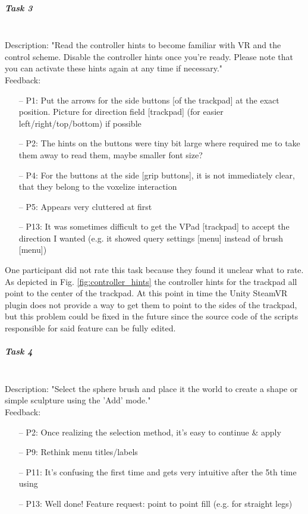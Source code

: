 \subparagraph{Task 3} \hfill \\
Description: "Read the controller hints to become familiar with VR and the control scheme. Disable the controller hints once you're ready. Please note that you can activate these hints
again at any time if necessary."\\
Feedback:
\begin{itemize} \setlength\itemsep{-0.5em}
	\item[--] P1: Put the arrows for the side buttons [of the trackpad] at the exact position. Picture for direction field [trackpad] (for easier left/right/top/bottom) if possible
	\item[--] P2: The hints on the buttons were tiny bit large where required me to take them away to read them, maybe smaller font size?
	\item[--] P4: For the buttons at the side [grip buttons], it is not immediately clear, that they belong to the voxelize interaction
	\item[--] P5: Appears very cluttered at first
	\item[--] P13: It was sometimes difficult to get the VPad [trackpad] to accept the direction I wanted (e.g. it showed query settings [menu] instead of brush [menu])
\end{itemize}
One participant did not rate this task because they found it unclear what to rate.\\
As depicted in Fig. \ref{fig:controller_hints} the controller hints for the trackpad all point to the center of the trackpad. At this point in time the Unity SteamVR plugin does not provide a way to get them to point to the sides of the trackpad, but this problem could be fixed in the future since the source code of the scripts responsible for said feature can be fully edited.

\subparagraph{Task 4} \hfill \\
Description: "Select the sphere brush and place it the world to create a shape or simple sculpture using the 'Add' mode."\\
Feedback:
\begin{itemize} \setlength\itemsep{-0.5em}
	\item[--] P2: Once realizing the selection method, it's easy to continue \& apply
	\item[--] P9: Rethink menu titles/labels
	\item[--] P11: It's confusing the first time and gets very intuitive after the 5th time using
	\item[--] P13: Well done! Feature request: point to point fill (e.g. for straight legs)
\end{itemize}

